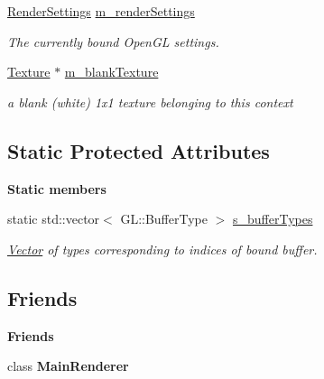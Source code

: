 \begin{Indent}
\begin{DoxyCompactItemize}
\mbox{\label{classrev_1_1_render_context_a373fe9b252ab9eb497199e1955930ce7}} 
\mbox{\hyperlink{classrev_1_1_render_settings}{Render\+Settings}} \mbox{\hyperlink{classrev_1_1_render_context_a373fe9b252ab9eb497199e1955930ce7}{m\+\_\+render\+Settings}}
\begin{DoxyCompactList}\small\item\em The currently bound Open\+GL settings. \end{DoxyCompactList}\item 
\mbox{\label{classrev_1_1_render_context_abd8047095cfcace632812f03f6f14317}} 
\mbox{\hyperlink{classrev_1_1_texture}{Texture}} $\ast$ \mbox{\hyperlink{classrev_1_1_render_context_abd8047095cfcace632812f03f6f14317}{m\+\_\+blank\+Texture}}
\begin{DoxyCompactList}\small\item\em a blank (white) 1x1 texture belonging to this context \end{DoxyCompactList}\end{DoxyCompactItemize}
\end{Indent}
\subsection*{Static Protected Attributes}
\begin{Indent}\textbf{ Static members}\par
\begin{DoxyCompactItemize}
\item 
static std\+::vector$<$ G\+L\+::\+Buffer\+Type $>$ \mbox{\hyperlink{classrev_1_1_render_context_a160e6d33ab3e3adf518931355dd638aa}{s\+\_\+buffer\+Types}}
\begin{DoxyCompactList}\small\item\em \mbox{\hyperlink{classrev_1_1_vector}{Vector}} of types corresponding to indices of bound buffer. \end{DoxyCompactList}\end{DoxyCompactItemize}
\end{Indent}
\subsection*{Friends}
\begin{Indent}\textbf{ Friends}\par
\begin{DoxyCompactItemize}
\item 
\mbox{\label{classrev_1_1_render_context_a3560f203ce16e7bc5e59e376a5eab798}} 
class {\bfseries Main\+Renderer}
\end{DoxyCompactItemize}
\end{Indent}

